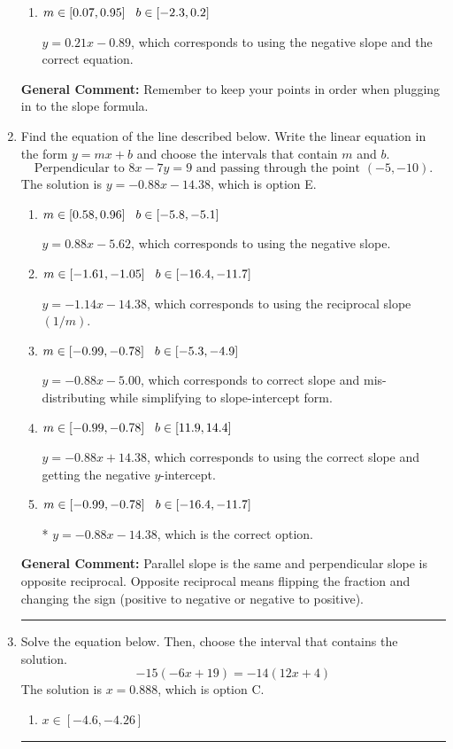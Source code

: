 \documentclass{extbook}[14pt]
\newcommand{\litem}[1]{\item #1

\rule{\textwidth}{0.4pt}}
\begin{document}
\begin{enumerate}
{\begin{enumerate}[label=\Alph*.]
* $y = -0.21x -5.11$, which is the correct option.
\item \( m \in [0.07, 0.95] \hspace*{3mm} b \in [-2.3, 0.2] \)

 $y = 0.21x -0.89$, which corresponds to using the negative slope and the correct equation.
\end{enumerate}

\textbf{General Comment:} Remember to keep your points in order when plugging in to the slope formula.
}
\litem{
Find the equation of the line described below. Write the linear equation in the form $ y=mx+b $ and choose the intervals that contain $m$ and $b$.
\[ \text{Perpendicular to } 8 x - 7 y = 9 \text{ and passing through the point } (-5, -10). \]The solution is \( y = -0.88x - 14.38 \), which is option E.\begin{enumerate}[label=\Alph*.]
\item \( m \in [0.58, 0.96] \hspace*{3mm} b \in [-5.8, -5.1] \)

 $y = 0.88x - 5.62$, which corresponds to using the negative slope.
\item \( m \in [-1.61, -1.05] \hspace*{3mm} b \in [-16.4, -11.7] \)

 $y = -1.14x - 14.38$, which corresponds to using the reciprocal slope $(1/m)$.
\item \( m \in [-0.99, -0.78] \hspace*{3mm} b \in [-5.3, -4.9] \)

 $y = -0.88x - 5.00$, which corresponds to correct slope and mis-distributing while simplifying to slope-intercept form.
\item \( m \in [-0.99, -0.78] \hspace*{3mm} b \in [11.9, 14.4] \)

 $y = -0.88x + 14.38$, which corresponds to using the correct slope and getting the negative $y$-intercept.
\item \( m \in [-0.99, -0.78] \hspace*{3mm} b \in [-16.4, -11.7] \)

* $y = -0.88x - 14.38$, which is the correct option.
\end{enumerate}

\textbf{General Comment:} Parallel slope is the same and perpendicular slope is opposite reciprocal. Opposite reciprocal means flipping the fraction and changing the sign (positive to negative or negative to positive).
}
\litem{
Solve the equation below. Then, choose the interval that contains the solution.
\[ -15(-6x + 19) = -14(12x + 4) \]The solution is \( x = 0.888 \), which is option C.\begin{enumerate}[label=\Alph*.]
\item \( x \in [-4.6, -4.26] \)


\end{enumerate}}
\end{enumerate}
\end{document}
